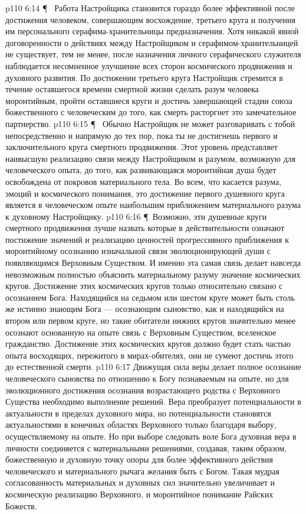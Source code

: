 \vs p110 6:14 \P\  Работа Настройщика становится гораздо более эффективной после достижения человеком, совершающим восхождение, третьего круга и получения им персонального серафима\hyp{}хранительницы предназначения. Хотя никакой явной договоренности о действиях между Настройщиком и серафимом\hyp{}хранительницей не существует, тем не менее, после назначения личного серафического служителя наблюдается несомненное улучшение всех сторон космического продвижения и духовного развития. По достижении третьего круга Настройщик стремится в течение оставшегося времени смертной жизни сделать разум человека моронтийным, пройти оставшиеся круги и достичь завершающей стадии союза божественного с человеческим до того, как смерть расторгнет это замечательное партнерство.
\vs p110 6:15 \P\  Обычно Настройщик не может разговаривать с тобой непосредственно и напрямую до тех пор, пока ты не достигнешь первого и заключительного круга смертного продвижения. Этот уровень представляет наивысшую реализацию связи между Настройщиком и разумом, возможную для человеческого опыта, до того, как развивающаяся моронтийная душа будет освобождена от покровов материального тела. Во всем, что касается разума, эмоций и космического понимания, это достижение первого душевного круга является в человеческом опыте наибольшим приближением материального разума к духовному Настройщику.
\vs p110 6:16 \P\ Возможно, эти душевные круги смертного продвижения лучше назвать  которые в действительности означают постижение значений и реализацию ценностей прогрессивного приближения к моронтийному осознанию изначальной связи эволюционирующей души с появляющимся Верховным Существом. И именно эта самая связь делает навсегда невозможным полностью объяснить материальному разуму значение космических кругов. Достижение этих космических кругов только относительно связано с осознанием Бога. Находящийся на седьмом или шестом круге может быть столь же истинно знающим Бога --- осознающим сыновство, как и находящийся на втором или первом круге, но такие обитатели нижних кругов значительно менее осознают основанную на опыте связь с Верховным Существом, вселенское гражданство. Достижение этих космических кругов должно будет стать частью опыта восходящих, пережитого в мирах\hyp{}обителях, они не сумеют достичь этого до естественной смерти.
\vs p110 6:17 Движущая сила веры делает полное осознание человеческого сыновства по отношению к Богу познаваемым на опыте, но для эволюционного достижения осознания возрастающего родства с  Верховного Существа необходимо  выполнение решений. Вера преобразует потенциальности в актуальности в пределах духовного мира, но потенциальности становятся актуальностями в конечных областях Верховного только благодаря выбору, осуществляемому на опыте. Но при выборе следовать воле Бога духовная вера в личности соединяется с материальными решениями, создавая, таким образом, божественную и духовную точку опоры для более эффективного действия человеческого и материального рычага желания быть с Богом. Такая мудрая согласованность материальных и духовных сил значительно увеличивает и космическую реализацию Верховного, и моронтийное понимание Райских Божеств.
